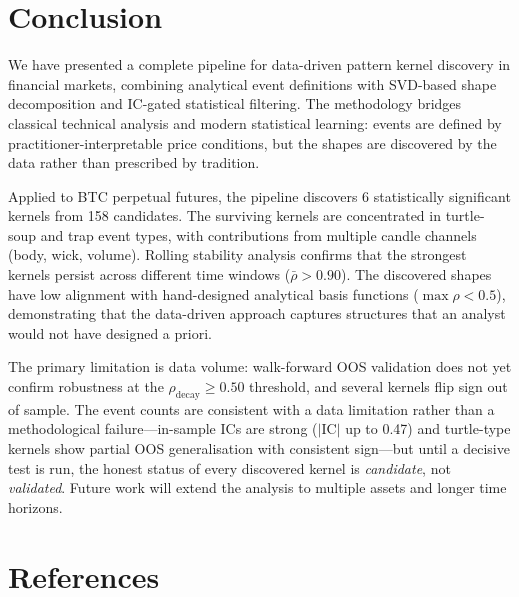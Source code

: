 \documentclass[11pt,a4paper]{article}
\theoremstyle{definition}
\theoremstyle{plain}
\begin{document}
\section{Conclusion}
\label{sec:conclusion}

We have presented a complete pipeline for data-driven pattern kernel
discovery in financial markets, combining analytical event definitions with
SVD-based shape decomposition and IC-gated statistical filtering. The
methodology bridges classical technical analysis and modern statistical
learning: events are defined by practitioner-interpretable price conditions,
but the shapes are discovered by the data rather than prescribed by
tradition.

Applied to BTC perpetual futures, the pipeline discovers 6 statistically
significant kernels from 158 candidates. The surviving kernels are
concentrated in turtle-soup and trap event types, with contributions from
multiple candle channels (body, wick, volume). Rolling stability analysis
confirms that the strongest kernels persist across different time windows
($\bar{\rho} > 0.90$). The discovered shapes have low alignment with
hand-designed analytical basis functions ($\max \rho < 0.5$), demonstrating
that the data-driven approach captures structures that an analyst would not
have designed a priori.

The primary limitation is data volume: walk-forward OOS validation does not
yet confirm robustness at the $\rho_{\mathrm{decay}} \geq 0.50$ threshold,
and several kernels flip sign out of sample.
The event counts are consistent with a data limitation rather than a
methodological failure---in-sample ICs are strong ($|\mathrm{IC}|$ up to
0.47) and turtle-type kernels show partial OOS generalisation with
consistent sign---but until a decisive test is run, the honest status of
every discovered kernel is \emph{candidate}, not \emph{validated}. Future work will extend the analysis to
multiple assets and longer time horizons.

\section*{References}
\end{document}
